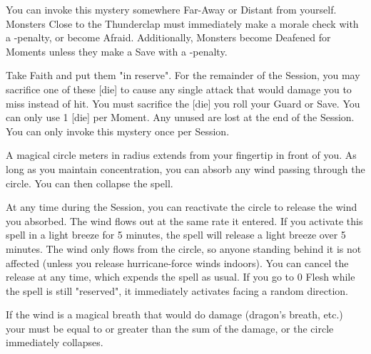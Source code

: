 {\MYSTERY [
  Name = Thunderclap,
  Link = arcana-mystery-thunderclap,
  Paradigm = Elements,
  Save = Y (neg.),
  Duration = Instant,
  Target = Far-Away or Distant
]

You can invoke this mystery somewhere Far-Away or Distant from yourself.  Monsters Close to the Thunderclap must immediately make a morale check with a -\DICE penalty, or become Afraid.  Additionally, Monsters become Deafened for \DICE Moments unless they make a Save with a -\DICE penalty.

\newpage

\MYSTERY [
  Name = Armor of Winds,
  Link = arcana-mystery-armor-of-winds,
  Paradigm = Entropy,
  Save = n/a,
  Duration = Session,
  Target = Self
]

Take \DICE Faith and put them "in reserve".  For the remainder of the Session, you may sacrifice one of these [die] to cause any single  attack that would damage you to miss instead of hit.  You must sacrifice the [die]  you roll your Guard or Save.  You can only use 1 [die] per Moment.  Any unused \DICE are lost at the end of the Session.  You can only invoke this mystery once per Session.

\MYSTERY [
  Name = Capture Wind,
  Link = arcana-mystery-capture-wind,
  Paradigm = Elements,
  Save = N,
  Duration = Concentration or Session,
  Target = See Below
]

A magical circle \DICE meters in radius extends from your fingertip in front of you. As long as you maintain concentration, you can absorb any wind passing through the circle. You can then collapse the spell. 

At any time during the Session, you can reactivate the circle to release the wind you absorbed.  The wind flows out at the same rate it entered. If you activate this spell in a light breeze for 5 minutes, the spell will release a light breeze over 5 minutes. The wind only flows from the circle, so anyone standing behind it is not affected (unless you release hurricane-force winds indoors). You can cancel the release at any time, which expends the spell as usual. If you go to 0 Flesh while the spell is still "reserved", it immediately activates facing a random direction.  

If the wind is a magical breath that would do damage (dragon's breath, etc.) your \SUMDICE must be equal to or greater than the sum of the damage, or the circle immediately collapses.  

}
